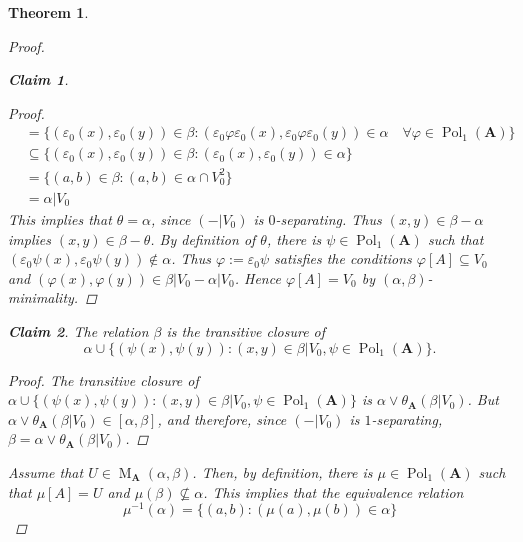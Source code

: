 \documentclass{amsart}
\theoremstyle{plain}
\newtheorem{theorem}{Theorem}[section]
\newtheorem{claim}{Claim}
\theoremstyle{definition}
\theoremstyle{remark}
\def\phi{\varphi}
\def\epsilon{\varepsilon}
\def\A{\forall}
\DeclareMathOperator{\Pol}{Pol}
\DeclareMathOperator{\M}{M}
\begin{document}
\begin{theorem}
\begin{proof}
\begin{claim}
\begin{proof}
\begin{align*}
                    & = \{(\epsilon_0(x), \epsilon_0(y)) \in \beta : (\epsilon_0 \phi \epsilon_0 (x), \epsilon_0 \phi \epsilon_0 (y)) \in \alpha \quad \A\phi \in \Pol_1(\mathbf{A})\}\\ 
                    & \subseteq \{(\epsilon_0(x), \epsilon_0(y)) \in \beta : (\epsilon_0 (x), \epsilon_0 (y)) \in \alpha \}\\ 
                    & = \{(a,b) \in \beta : (a, b ) \in \alpha \cap V^2_0\}\\ 
                    & = \alpha | V_0 
                \end{align*} 
            This implies that $\theta = \alpha $, since $(-|V_0)$ is $0$-separating. 
            Thus $(x,y) \in \beta - \alpha$ implies $(x,y) \in \beta - \theta$. 
            By definition of $\theta$, there is $\psi \in \Pol_1(\mathbf{A})$ such that $(\epsilon_0 \psi (x), \epsilon_0\psi (y)) \notin \alpha$. 
            Thus $\phi:=\epsilon_0 \psi$ satisfies the conditions $\phi[A] \subseteq V_0$ and $(\phi(x), \phi(y)) \in \beta |V_0 - \alpha|V_0$. 
            Hence $\phi[A] = V_0$ by $(\alpha, \beta)$-minimality. 
            \end{proof}
        \end{claim}
        \begin{claim}
            \label{lemma_pol_claim2}
            The relation $\beta$ is the transitive closure of 
            \begin{equation*}
                \alpha \cup \{(\psi(x), \psi(y)) : (x,y) \in \beta|V_0, \psi \in \Pol_1(\mathbf{A})\} \text{.}
            \end{equation*}
            \begin{proof}
                The transitive closure of $\alpha \cup \{(\psi(x), \psi(y)) : (x,y) \in \beta|V_0, \psi \in \Pol_1(\mathbf{A})\}$ is $\alpha \lor \theta_\mathbf{A}(\beta|V_0)$. 
                But $\alpha \lor \theta_\mathbf{A}(\beta|V_0) \in [\alpha, \beta]$, and therefore, since $(-|V_0)$ is $1$-separating, $\beta=\alpha \lor \theta_\mathbf{A}(\beta|V_0)$. 
            \end{proof}
        \end{claim}
        Assume that $U \in \M_{\mathbf{A}}(\alpha, \beta)$. 
        Then, by definition, there is $\mu \in \Pol_1(\mathbf{A})$ such that $\mu[A] =U$ and $\mu(\beta) \nsubseteq \alpha$. 
        This implies that the equivalence relation 
        \begin{equation*}
            \mu^{-1}(\alpha)=\{(a,b): (\mu(a), \mu(b)) \in \alpha\} 

\end{equation*}
\end{proof}
\end{theorem}
\end{document}
